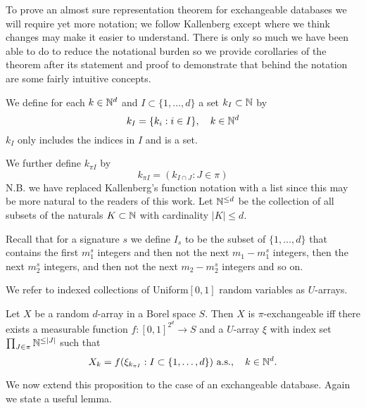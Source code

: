 To prove an almost sure representation theorem for exchangeable databases we will require yet more notation; we follow Kallenberg except where we think changes may make it easier to understand.
There is only so much we have been able to do to reduce the notational burden so we provide corollaries of the theorem after its statement and proof to demonstrate that behind the notation are some fairly intuitive concepts.

We define for each $k \in \mathbb{N}^d$ and $I \subset \{1,\ldots,d\}$ a set $k_I \subset \mathbb{N}$ by
\begin{equation}
k_I = \{k_i: i \in I\}, \quad k \in \mathbb{N}^d
\end{equation}
\ie $k_I$ only includes the indices in $I$ and is a set.

We further define $k_{\pi I}$ by
\begin{equation}
  k_{\pi I} = (k_{I \cap J} : J \in \pi)
\end{equation}
N.B. we have replaced Kallenberg's function notation with a list since this may be more natural to the readers of this work.
Let $\mathbb{N}^{\leq d}$ be the collection of all subsets of the naturals $K \subset \mathbb{N}$ with cardinality $|K| \leq d$.

Recall that for a signature $s$ we define $I_s$ to be the subset of $\{1,\ldots,d\}$ that contains the first $m_1^s$ integers and then not the next $m_1 - m_1^s$ integers, then the next $m_2^s$ integers, and then not the next $m_2 - m_2^s$ integers and so on.

We refer to indexed collections of \iid Uniform$[0,1]$ random variables as $U$-arrays.

\begin{prop}
\label{prop:piexas}
  Let $X$ be a random $d$-array in a Borel space $S$.
  Then $X$ is $\pi$-exchangeable iff there exists a measurable function $f:[0,1]^{2^d}\to S$ and a $U$-array $\xi$ with index set $\prod_{J\in\pi} \mathbb{N}^{\leq |J|}$ such that
  \begin{equation}
    X_k = f(\xi_{k_{\pi I}} : I \subset \{1,\ldots,d\}) \ \textrm{a.s.}, \quad k \in \mathbb{N}^d.
    \label{eq:piexas}
  \end{equation}
\end{prop}

We now extend this proposition to the case of an exchangeable database.
Again we state a useful lemma.

